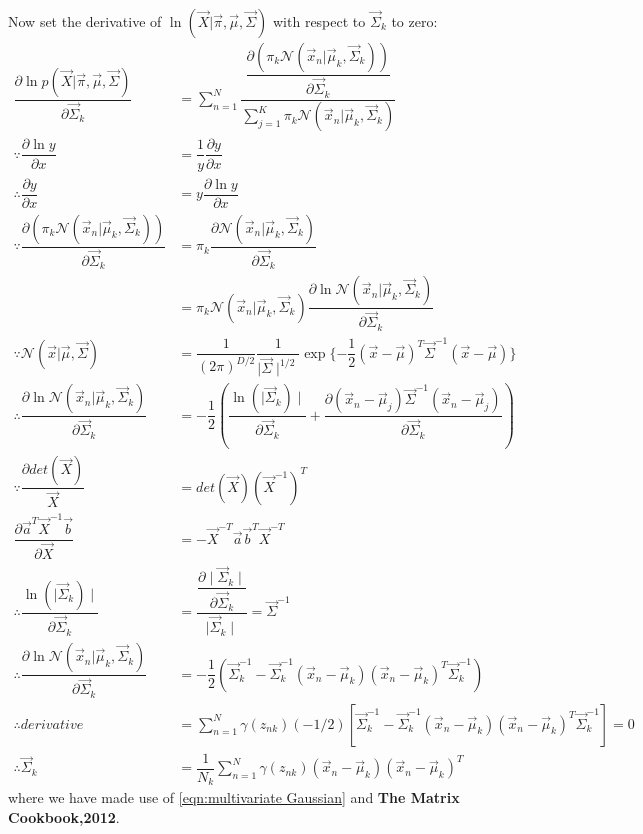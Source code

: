 Now set the derivative of $\ln(\vec{X}|\vec{\pi},\vec{\mu},\vec{\Sigma})$ with respect to $\vec{\Sigma}_k$ to zero:
\begin{align}
\dfrac{\partial\ln p(\vec{X}|\vec{\pi},\vec{\mu},\vec{\Sigma})}{\partial\vec{\Sigma}_k} 
&=\sum_{n=1}^{N}\dfrac{\dfrac{\partial(\pi_k\mathcal{N}(\vec{x}_n|\vec{\mu}_k,\vec{\Sigma}_k))}{\partial\vec{\Sigma}_k}}
{\sum_{j=1}^{K}\pi_k\mathcal{N}(\vec{x}_n|\vec{\mu}_k,\vec{\Sigma}_k)}\\
\because
 \dfrac{\partial \ln y}{\partial x} &= \dfrac{1}{y}\dfrac{\partial y}{\partial x} \\
\therefore \dfrac{\partial y}{\partial x} &= y\dfrac{\partial\ln y}{\partial x}\\
\because \dfrac{\partial(\pi_k\mathcal{N}(\vec{x}_n|\vec{\mu}_k,\vec{\Sigma}_k))}{\partial\vec{\Sigma}_k} 
&= \pi_k\dfrac{\partial\mathcal{N}(\vec{x}_n|\vec{\mu}_k,\vec{\Sigma}_k)}{\partial\vec{\Sigma}_k}\\
&= \pi_k\mathcal{N}(\vec{x}_n|\vec{\mu}_k,\vec{\Sigma}_k)
\dfrac{\partial\ln\mathcal{N}(\vec{x}_n|\vec{\mu}_k,\vec{\Sigma}_k)}{\partial\vec{\Sigma}_k}\\
\because 
\mathcal{N}(\vec{x}|\vec{\mu},\vec{\Sigma})
&=\dfrac{1}{(2\pi)^{D/2}}\dfrac{1}{\mid \vec{\Sigma}\mid^{1/2}}
\exp\{-\dfrac{1}{2}(\vec{x}-\vec{\mu})^T\vec{\Sigma}^{-1}(\vec{x}-\vec{\mu}) \} \\
\therefore \dfrac{\partial\ln\mathcal{N}(\vec{x}_n|\vec{\mu}_k,\vec{\Sigma}_k)}{\partial\vec{\Sigma}_k}
&=-\dfrac{1}{2}(\dfrac{\ln(\mid\vec{\Sigma}_k)\mid}{\partial\vec{\Sigma}_k}
 +\dfrac{\partial(\vec{x}_n-\vec{\mu}_j)\vec{\Sigma}^{-1}(\vec{x}_n-\vec{\mu}_j)}{\partial\vec{\Sigma}_k}) \\
\because
 \dfrac{\partial det(\vec{X})}{\vec{X}} &=det(\vec{X})(\vec{X}^{-1})^T \\
\dfrac{\partial\vec{a}^T\vec{X}^{-1}\vec{b}}{\partial\vec{X}}
&= -\vec{X}^{-T}\vec{a}\vec{b}^T\vec{X}^{-T} \\
\therefore 
\dfrac{\ln(\mid\vec{\Sigma}_k)\mid}{\partial\vec{\Sigma}_k}
&=\dfrac{\dfrac{\partial\mid\vec{\Sigma}_k\mid}{\partial\vec{\Sigma}_k}}{\mid\vec{\Sigma}_k\mid} =\vec{\Sigma}^{-1}\\
\therefore 
\dfrac{\partial\ln\mathcal{N}(\vec{x}_n|\vec{\mu}_k,\vec{\Sigma}_k)}{\partial\vec{\Sigma}_k} 
&=-\dfrac{1}{2}(\vec{\Sigma}_k^{-1}-\vec{\Sigma}_k^{-1}(\vec{x}_n-\vec{\mu}_k)(\vec{x}_n-\vec{\mu}_k)^T\vec{\Sigma}_k^{-1}) \\
\therefore derivative&=\sum_{n=1}^{N}\gamma(z_{nk})(-1/2)[\vec{\Sigma}_k^{-1}-\vec{\Sigma}_k^{-1}(\vec{x}_n-\vec{\mu}_k)(\vec{x}_n-\vec{\mu}_k)^T\vec{\Sigma}_k^{-1}] =0 \\
\therefore \vec{\Sigma}_k&=\dfrac{1}{N_k}\sum_{n=1}^{N}\gamma(z_{nk})(\vec{x}_n-\vec{\mu}_k)(\vec{x}_n-\vec{\mu}_k)^T
\end{align}
where we have made use of \ref{eqn:multivariate Gaussian} and \textbf{The Matrix Cookbook,2012}.

